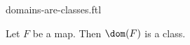 \documentclass{stex}
\begin{document}
\begin{smodule}{domains-are-classes.ftl}
  \begin{flemma*}
    Let $F$ be a map.
    Then $\dom(F)$ is a class.
  \end{flemma*}
\end{smodule}
\end{document}
